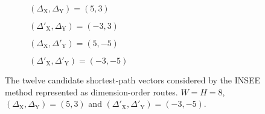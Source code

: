 				\begin{figure}
					\center
					\begin{subfigure}{0.45\linewidth}
						\center
						\caption{$(\Delta_\textrm{X}, \Delta_\textrm{Y}) = (5,3)$}
						\label{fig:insee-vector-candidates-no-wrap}
					\end{subfigure}
					\begin{subfigure}{0.45\linewidth}
						\center
						\caption{$(\Delta'_\textrm{X}, \Delta_\textrm{Y}) = (-3,3)$}
						\label{fig:insee-vector-candidates-wrap-x}
					\end{subfigure}
					
					\vspace{1em}
					
					\begin{subfigure}{0.45\linewidth}
						\center
						\caption{$(\Delta_\textrm{X}, \Delta'_\textrm{Y}) = (5,-5)$}
						\label{fig:insee-vector-candidates-wrap-y}
					\end{subfigure}
					\begin{subfigure}{0.45\linewidth}
						\center
						\caption{$(\Delta'_\textrm{X}, \Delta'_\textrm{Y}) = (-3,-5)$}
						\label{fig:insee-vector-candidates-wrap}
					\end{subfigure}
					
					\vspace{1em}
					
					
					\caption[The twelve candidate vectors considered by the INSEE method.]%
					{The twelve candidate shortest-path vectors considered by the INSEE
					method represented as dimension-order routes. $W=H=8$,
					$(\Delta_\textrm{X},\Delta_\textrm{Y}) = (5, 3)$ and
					$(\Delta'_\textrm{X},\Delta'_\textrm{Y}) = (-3, -5)$.}
					\label{fig:insee-vector-candidates}
				\end{figure}
				
